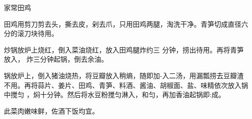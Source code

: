 \begin{recipe}{家常田鸡}

\ingredients


\preparation

\step 田鸡用剪刀剪去头，撕去皮，剁去爪，只用田鸡两腿，淘洗干净。青笋切成直径六
分的滚刀块待用。

炒锅放炉上烧红，倒入菜油烧红，放入田鸡腿炸约三 分钟，捞出待用。再将青笋放入，
炸三分钟起锅，倒去余油。

\step 锅放炉上，倒入猪油烧热，将豆瓣放入稍熵，随即加-入二汤，用漏瓢捞去豆瓣渣
不用。再将蒜片、姜片、田鸡、青笋、料酒、酱油、胡椒面、盐、味精依次放入锅中搅匀
，焖十分钟。然后将水豆粉搅匀淋入，和匀，再加香油起锅即:成。

\features

此菜肉嫩味鲜，佐酒下饭均宜。

\end{recipe}

